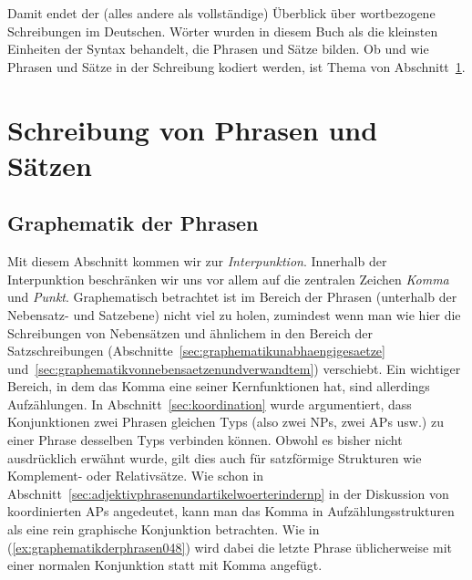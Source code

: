 Damit endet der (alles andere als vollständige) Überblick über wortbezogene Schreibungen im Deutschen.
Wörter wurden in diesem Buch als die kleinsten Einheiten der Syntax behandelt, die Phrasen und Sätze bilden.
Ob und wie Phrasen und Sätze in der Schreibung kodiert werden, ist Thema von Abschnitt~\ref{sec:schreibungvonphrasenundsaetzen}.


\section{Schreibung von Phrasen und Sätzen}
\label{sec:schreibungvonphrasenundsaetzen}

\subsection{Graphematik der Phrasen}
\label{sec:graphematikderphrasen}

Mit diesem Abschnitt kommen wir zur \textit{Interpunktion}.
Innerhalb der Interpunktion beschränken wir uns vor allem auf die zentralen Zeichen \textit{Komma} und \textit{Punkt}.
Graphematisch betrachtet ist im Bereich der Phrasen (unterhalb der Nebensatz- und Satzebene) nicht viel zu holen, zumindest wenn man wie hier die Schreibungen von Nebensätzen und ähnlichem in den Bereich der Satzschreibungen (Abschnitte~\ref{sec:graphematikunabhaengigesaetze} und~\ref{sec:graphematikvonnebensaetzenundverwandtem}) verschiebt.
Ein wichtiger Bereich, in dem das Komma eine seiner Kernfunktionen hat, sind allerdings Aufzählungen.
In Abschnitt~\ref{sec:koordination} wurde argumentiert, dass Konjunktionen zwei Phrasen gleichen Typs (also zwei NPs, zwei APs usw.) zu einer Phrase desselben Typs verbinden können.
Obwohl es bisher nicht ausdrücklich erwähnt wurde, gilt dies auch für satzförmige Strukturen wie Komplement- oder Relativsätze.
Wie schon in Abschnitt~\ref{sec:adjektivphrasenundartikelwoerterindernp} in der Diskussion von koordinierten APs angedeutet, kann man das Komma in Aufzählungsstrukturen als eine rein graphische Konjunktion betrachten.
Wie in (\ref{ex:graphematikderphrasen048}) wird dabei die letzte Phrase üblicherweise mit einer normalen Konjunktion statt mit Komma angefügt.

